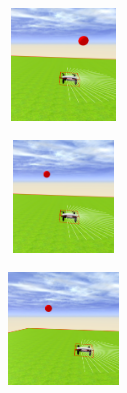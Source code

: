 \begin{figure}[htbp]
\begin{subfigure}[t]{0.2\textwidth}
    \includegraphics[width=3cm, height=3cm]{img/followBallTello4.png}
\label{fig:figure2_4}
\end{subfigure}\hfill
\begin{subfigure}[t]{0.2\textwidth}
    \includegraphics[width=3cm, height=3cm]{img/followBallTello5.png}
\label{fig:figure2_5}
\end{subfigure}\hfill
\begin{subfigure}[t]{0.2\textwidth}
    \includegraphics[width=3cm, height=3cm]{img/followBallTello6.png}
\label{fig:figure2_6}
\end{subfigure}


\end{figure}

